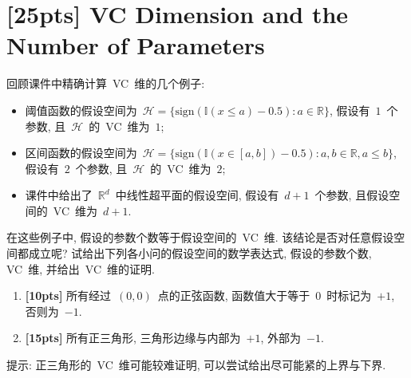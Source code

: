 \documentclass[a4paper,UTF8]{article}
\numberwithin{equation}{section}
\begin{document}
\newpage 

\section{[25pts] VC Dimension and the Number of Parameters} 

\noindent 回顾课件中精确计算~VC~维的几个例子: 
\begin{itemize}
    \item 阈值函数的假设空间为~$ \mathcal{H} = \{ \text{sign}( \mathbb{I}(x \leqslant a) - 0.5 ) : a \in \mathbb{R} \} $, 假设有~$1$~个参数, 且~$\mathcal{H}$~的~VC~维为~$1$; 
    \item 区间函数的假设空间为~$ \mathcal{H} = \{ \text{sign}( \mathbb{I}( x \in [a,b] ) - 0.5 ) : a,b \in \mathbb{R} , a \leqslant b \} $, 假设有~$2$~个参数, 且~$\mathcal{H}$~的~VC~维为~$2$; 
    \item 课件中给出了~$\mathbb{R}^d$~中线性超平面的假设空间, 假设有~$d+1$~个参数, 且假设空间的~VC~维为~$d+1$. 
\end{itemize}
在这些例子中, 假设的参数个数等于假设空间的~VC~维. 该结论是否对任意假设空间都成立呢? 试给出下列各小问的假设空间的数学表达式, 假设的参数个数, VC~维, 并给出~VC~维的证明. 
\begin{enumerate}[(1)]
    \item \textbf{[10pts]} 所有经过~$(0,0)$~点的正弦函数, 函数值大于等于~$0$~时标记为~$+1$, 否则为~$-1$. 
    \item \textbf{[15pts]} 所有正三角形, 三角形边缘与内部为~$+1$, 外部为~$-1$. 
\end{enumerate}
提示: 正三角形的~VC~维可能较难证明, 可以尝试给出尽可能紧的上界与下界. 
\end{document}
